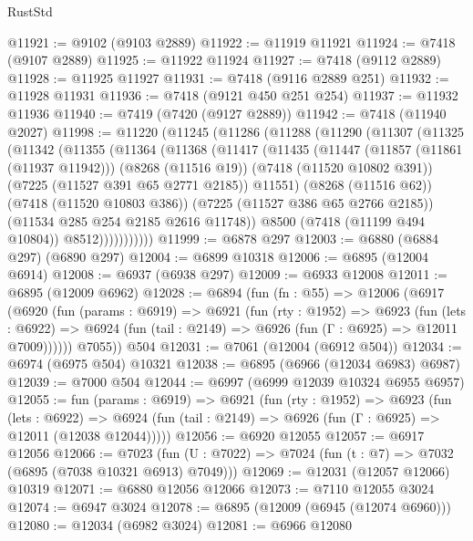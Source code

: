 \begin{lexlean}{RustStd}
\begin{coremodule}
@11921 := @9102 (@9103 @2889)
@11922 := @11919 @11921
@11924 := @7418 (@9107 @2889)
@11925 := @11922 @11924
@11927 := @7418 (@9112 @2889)
@11928 := @11925 @11927
@11931 := @7418 (@9116 @2889 @251)
@11932 := @11928 @11931
@11936 := @7418 (@9121 @450 @251 @254)
@11937 := @11932 @11936
@11940 := @7419 (@7420 (@9127 @2889))
@11942 := @7418 (@11940 @2027)
@11998 := @11220
    (@11245
      (@11286
        (@11288
          (@11290
            (@11307
              (@11325
                (@11342
                  (@11355
                    (@11364
                      (@11368
                        (@11417
                          (@11435
                            (@11447
                              (@11857 (@11861 (@11937 @11942)))
                              (@8268 (@11516 @19))
                              (@7418 (@11520 @10802 @391))
                              (@7225 (@11527 @391 @65 @2771 @2185))
                              @11551)
                            (@8268 (@11516 @62))
                            (@7418 (@11520 @10803 @386))
                            (@7225 (@11527 @386 @65 @2766 @2185))
                            (@11534 @285 @254 @2185 @2616 @11748))
                          @8500
                          (@7418 (@11199 @494 @10804))
                          @8512)))))))))))
@11999 := @6878 @297
@12003 := @6880 (@6884 @297) (@6890 @297)
@12004 := @6899 @10318
@12006 := @6895 (@12004 @6914)
@12008 := @6937 (@6938 @297)
@12009 := @6933 @12008
@12011 := @6895 (@12009 @6962)
@12028 := @6894
    (fun (fn : @55) =>
    @12006
      (@6917
        (@6920
          (fun (params : @6919) =>
          @6921
            (fun (rty : @1952) =>
            @6923
              (fun (lets : @6922) =>
              @6924 (fun (tail : @2149) => @6926 (fun (Γ : @6925) => @12011 @7009))))))
        @7055))
    @504
@12031 := @7061 (@12004 (@6912 @504))
@12034 := @6974 (@6975 @504) @10321
@12038 := @6895 (@6966 (@12034 @6983) @6987)
@12039 := @7000 @504
@12044 := @6997 (@6999 @12039 @10324 @6955 @6957)
@12055 := fun (params : @6919) =>
  @6921
    (fun (rty : @1952) =>
    @6923
      (fun (lets : @6922) =>
      @6924 (fun (tail : @2149) => @6926 (fun (Γ : @6925) => @12011 (@12038 @12044)))))
@12056 := @6920 @12055
@12057 := @6917 @12056
@12066 := @7023
    (fun (U : @7022) => @7024 (fun (t : @7) => @7032 (@6895 (@7038 @10321 @6913) @7049)))
@12069 := @12031 (@12057 @12066) @10319
@12071 := @6880 @12056 @12066
@12073 := @7110 @12055 @3024
@12074 := @6947 @3024
@12078 := @6895 (@12009 (@6945 (@12074 @6960)))
@12080 := @12034 (@6982 @3024)
@12081 := @6966 @12080

\end{coremodule}
\end{lexlean}

